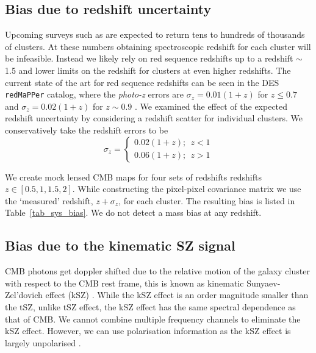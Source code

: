  \subsection{Bias due to redshift uncertainty}
Upcoming surveys such as \citep{benson14,so18, cmbs4-sb1} are expected to return tens to hundreds of thousands of clusters. 
 At these numbers obtaining spectroscopic redshift for each cluster will be infeasible.  
Instead we likely rely on red sequence redshifts up to a redshift $\sim$ 1.5 and lower limits on the redshift for clusters at even higher redshifts. 
The current state of the art for red sequence redshifts can be seen in the  DES \texttt{redMaPPer} catalog, where the \emph{photo-z} errors are $\sigma_{z} = 0.01 (1+z)$ for $z \le 0.7$ and $\sigma_{z} = 0.02 (1+z)$ for $z \sim 0.9$ \citep{rykoff16}. We examined the effect of the expected redshift uncertainty by considering a redshift scatter for individual clusters. We conservatively take the redshift errors to be
\begin{equation}\nonumber
\sigma_z = \left\{
\begin{array}{l}
    0.02 (1+z);  ~~z < 1 \\
    0.06 (1+z);  ~~z > 1
  \end{array}\right.
\end{equation}

We create mock lensed CMB maps for four sets of redshifts redshifts $z\in[0.5, 1, 1.5, 2]$. While constructing the pixel-pixel covariance matrix we use the `measured' redshift, $z + \sigma_{z}$, for each cluster.                                                                        
The resulting bias is listed in Table~\ref{tab_sys_bias}. We do not detect a mass bias at any redshift. 
 
\subsection{Bias due to the kinematic SZ signal}
\label{sec_ksz_bias}
CMB photons get doppler shifted due to the relative motion of the galaxy cluster with respect to the CMB rest frame, this is known as kinematic Sunyaev-Zel'dovich effect (kSZ) \citep{sunyaev72}.
While the kSZ effect is an order magnitude smaller than the tSZ, unlike tSZ effect, the kSZ effect has the same spectral dependence as that of CMB. 
We cannot combine multiple frequency channels to eliminate the kSZ effect. 
However, we can use polarisation information as the kSZ effect is largely unpolarised  \citep{sazonov99}.

